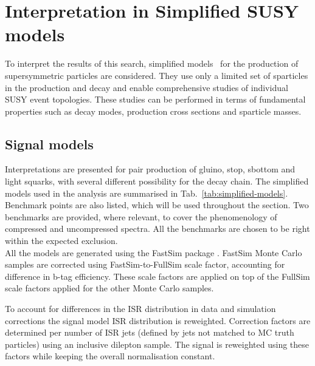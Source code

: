 \section{Interpretation in Simplified SUSY models}
\label{sec:susy}


To interpret the results of this search, simplified
models~\cite{Alwall:2008ag,Alwall:2008va,Alves:2011wf} for the production of supersymmetric particles are considered. 
They use only a limited set of sparticles in the production and
decay and enable comprehensive studies of individual SUSY event
topologies. These studies can be performed in terms of
fundamental properties such as decay modes, production cross sections and sparticle masses. 

\subsection{Signal models}
\label{sec:susy_models}
Interpretations are presented for pair production of gluino, stop, sbottom and light squarks, 
with several different possibility for the decay chain. 
The simplified models used in the analysis are summarised in Tab.~\ref{tab:simplified-models}. 
Benchmark points are also listed, which will be used throughout the section. 
Two benchmarks are provided, where relevant, to cover the phenomenology of compressed and uncompressed spectra. 
All the benchmarks are chosen to be right within the expected exclusion. \\

All the models are generated using the FastSim package \cite{Abdullin:2011zz}. 
FastSim Monte Carlo samples are corrected using FastSim-to-FullSim scale factor, 
accounting for difference in b-tag efficiency. 
These scale factors are applied on top of the FullSim scale factors applied for the 
other Monte Carlo samples.

To account for differences in the ISR distribution in data and simulation corrections the signal model 
ISR distribution is reweighted. Correction factors are determined per number of ISR jets (defined by jets not matched to MC truth particles) 
using an inclusive dilepton \ttbar sample. The signal is reweighted using these factors while keeping the overall normalisation constant. 

